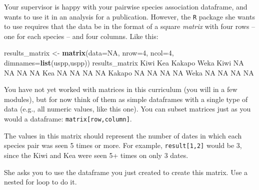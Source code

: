 \documentclass[]{book}
\newenvironment{Shaded}{\begin{snugshade}}{\end{snugshade}}
\newcommand{\DataTypeTok}[1]{\textcolor[rgb]{0.13,0.29,0.53}{#1}}
\newcommand{\DecValTok}[1]{\textcolor[rgb]{0.00,0.00,0.81}{#1}}
\newcommand{\KeywordTok}[1]{\textcolor[rgb]{0.13,0.29,0.53}{\textbf{#1}}}
\newcommand{\NormalTok}[1]{#1}
\newcommand{\OtherTok}[1]{\textcolor[rgb]{0.56,0.35,0.01}{#1}}
\newcommand{\StringTok}[1]{\textcolor[rgb]{0.31,0.60,0.02}{#1}}
\begin{document}
Your supervisor is happy with your pairwise species association dataframe, and wants to use it in an analysis for a publication. However, the \texttt{R} package she wants to use requires that the data be in the format of a square \emph{matrix} with four rows -- one for each species -- and four columns. Like this:

\begin{Shaded}
\begin{Highlighting}[]
\NormalTok{results_matrix <-}\StringTok{ }\KeywordTok{matrix}\NormalTok{(}\DataTypeTok{data=}\OtherTok{NA}\NormalTok{, }\DataTypeTok{nrow=}\DecValTok{4}\NormalTok{, }\DataTypeTok{ncol=}\DecValTok{4}\NormalTok{, }\DataTypeTok{dimnames=}\KeywordTok{list}\NormalTok{(uspp,uspp))}
\NormalTok{results_matrix}
\NormalTok{       Kiwi Kea Kakapo Weka}
\NormalTok{Kiwi     }\OtherTok{NA}  \OtherTok{NA}     \OtherTok{NA}   \OtherTok{NA}
\NormalTok{Kea      }\OtherTok{NA}  \OtherTok{NA}     \OtherTok{NA}   \OtherTok{NA}
\NormalTok{Kakapo   }\OtherTok{NA}  \OtherTok{NA}     \OtherTok{NA}   \OtherTok{NA}
\NormalTok{Weka     }\OtherTok{NA}  \OtherTok{NA}     \OtherTok{NA}   \OtherTok{NA}
\end{Highlighting}
\end{Shaded}

You have not yet worked with matrices in this curriculum (you will in a few modules), but for now think of them as simple dataframes with a single type of data (e.g., all numeric values, like this one). You can subset matrices just as you would a dataframe: \texttt{matrix{[}row,column{]}}.

The values in this matrix should represent the number of dates in which each species pair was seen 5 times or more. For example, \texttt{result{[}1,2{]}} would be 3, since the Kiwi and Kea were seen 5+ times on only 3 dates.

She asks you to use the dataframe you just created to create this matrix. Use a nested for loop to do it.
\end{document}
